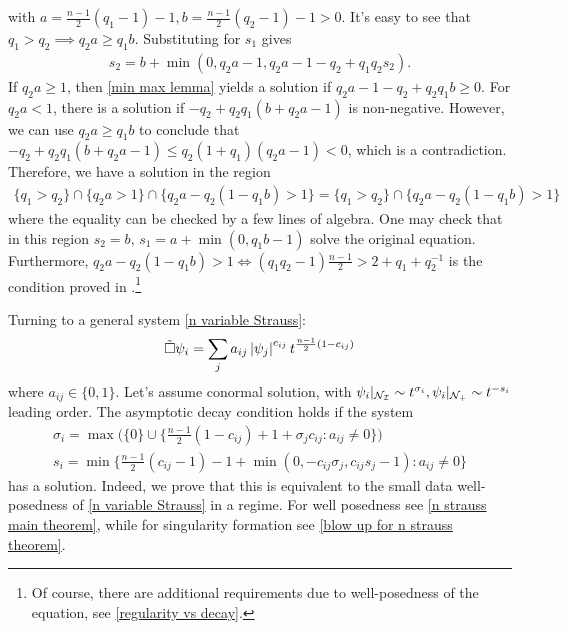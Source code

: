 \documentclass[11pt, oneside]{amsart}
\begin{document}
	with $a=\frac{n-1}{2}(q_1-1)-1,b=\frac{n-1}{2}(q_2-1)-1>0$. It's easy to see that $q_1>q_2\implies q_2a\geq q_1b$. Substituting for $s_1$ gives
	\begin{equation*}
		\begin{gathered}
			s_2=b+\min(0,q_2a-1,q_2a-1-q_2+q_1q_2s_2).
		\end{gathered}
	\end{equation*} 
	If $q_2a\geq1$, then \cref{min max lemma} yields a solution if $q_2a-1-q_2+q_2q_1b\geq0$. For $q_2a<1$, there is a solution if $-q_2+q_2q_1(b+q_2a-1)$ is non-negative. However, we can use $q_2a\geq q_1b$ to conclude that $-q_2+q_2q_1(b+q_2a-1)\leq q_2(1+q_1)(q_2a-1)<0$, which is a contradiction. Therefore, we have a solution in the region 
	\begin{equation*}
		\begin{gathered}
			\{q_1>q_2\}\cap\{q_2a>1\}\cap\{q_2a-q_2(1-q_1b)>1\}=\{q_1>q_2\}\cap\{q_2a-q_2(1-q_1b)>1\}
		\end{gathered}
	\end{equation*}
	where the equality can be checked by a few lines of algebra. One may check that in this region $s_2=b,\,s_1=a+\min(0,q_1b-1)$ solve the original equation. Furthermore, $q_2a-q_2(1-q_1b)>1\iff (q_1q_2-1)\frac{n-1}{2}>2+q_1+q_2^{-1}$ is the condition proved in \cite{del_santo_global_1997}.\footnote{Of course, there are additional requirements due to well-posedness of the equation, see \cref{regularity vs decay}.}
	
	Turning to a general system \cref{n variable Strauss}:
	\begin{equation*}
		\begin{gathered}
			\tilde{\Box}\psi_i=\sum_j a_{ij}\left\lvert \psi_j\right\rvert^{c_{ij}}t^{\frac{n-1}{2}(1-c_{ij})}
		\end{gathered}
	\end{equation*}
	where $a_{ij}\in\{0,1\}$. Let's assume conormal solution, with $\psi_i|_{\mathcal{N}_{\mathcal{I}}}\sim t^{\sigma_i},\psi_i|_{\mathcal{N}_+}\sim t^{-s_i}$ leading order. The asymptotic decay condition holds if the system
	\begin{equation}\label{n variable Strauss condition}
		\begin{gathered}
			\sigma_i=\max\bigg(\{0\}\cup\Big\{\frac{n-1}{2}(1-c_{ij})+1+\sigma_jc_{ij}:a_{ij}\neq0\Big\}\bigg)\\
			s_i=\min\Big\{\frac{n-1}{2}(c_{ij}-1)-1+\min(0,-c_{ij}\sigma_j,c_{ij}s_j-1):a_{ij}\neq0\Big\}
		\end{gathered}
	\end{equation}
	has a solution. Indeed, we prove that this is equivalent to the small data well-posedness of \eqref{n variable Strauss} in a regime. For well posedness see \cref{n strauss main theorem}, while for singularity formation see \cref{blow up for n strauss theorem}.
\end{document}
